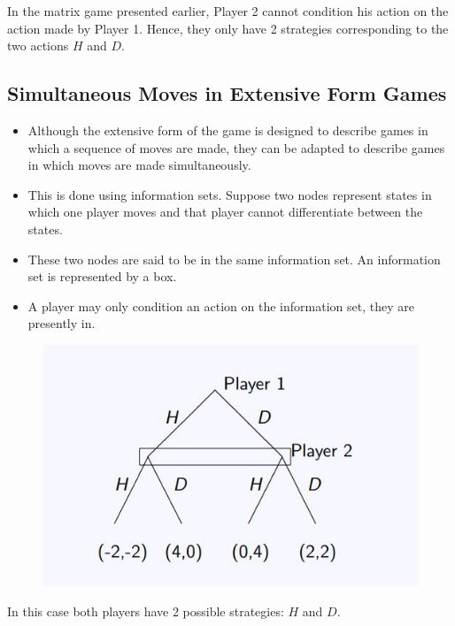 \documentclass[]{report}
\begin{document}
In the matrix game presented earlier, Player 2 cannot condition his
action on the action made by Player 1. Hence, they only have 2
strategies corresponding to the two actions $H$ and $D$.

\subsection{Simultaneous Moves in Extensive Form Games}
\begin{itemize}
	\item Although the extensive form of the game is designed to describe
	games in which a sequence of moves are made, they can be
	adapted to describe games in which moves are made
	simultaneously.
	\item This is done using information sets. Suppose two nodes represent
	states in which one player moves and that player cannot
	differentiate between the states.
	\item These two nodes are said to be in the same information set. An
	information set is represented by a box.
	\item A player may only condition an action on the information set,
	they are presently in.
\end{itemize}




\begin{figure}[h!]
\centering
\includegraphics[width=0.55\linewidth]{images/DR5-Slide15}
\caption{}
\label{fig:DR5-Slide15}
\end{figure}
\noindent In this case both players have 2 possible strategies: $H$ and $D$.

\end{document}
